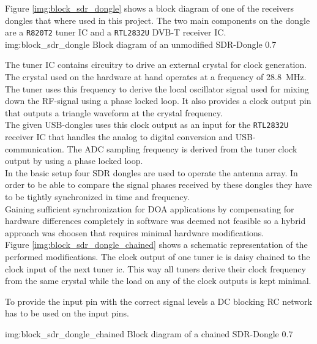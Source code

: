 Figure \ref{img:block_sdr_dongle} shows a block
diagram of one of the receivers dongles that where used
in this project.
The two main components on the dongle are a \texttt{R820T2} tuner IC
and a \texttt{RTL2832U} DVB-T receiver IC. \\

             {img:block_sdr_dongle}
             {Block diagram of an unmodified SDR-Dongle}
             {0.7}

The tuner IC contains circuitry to drive an
external crystal for clock generation.
The crystal used on the hardware at hand
operates at a frequency of \SI{28.8}{\mega\hertz}.
The tuner uses this frequency to derive the
local oscillator signal used for mixing down
the RF-signal using a phase locked loop.
It also provides a clock output pin that
outputs a triangle waveform at the crystal
frequency. \\

The given USB-dongles uses this clock output
as an input for the \texttt{RTL2832U}
receiver IC that handles the analog to digital
conversion and USB-communication.
The ADC sampling frequency is derived from
the tuner clock output by using a phase locked loop. \\

In the basic setup four SDR dongles are used
to operate the antenna array.
In order to be able to compare the signal phases
received by these dongles they have to be tightly
synchronized in time and frequency. \\

Gaining sufficient synchronization for DOA applications
by compensating for hardware differences completely
in software was deemed not feasible so a hybrid
approach was choosen that requires minimal hardware
modifications. \\


Figure \ref{img:block_sdr_dongle_chained} shows
a schematic representation of the performed modifications.
The clock output of one tuner ic is daisy chained to
the clock input of the next tuner ic.
This way all tuners derive their clock frequency
from the same crystal while the load on any of
the clock outputs is kept minimal.

To provide the input pin with the correct signal
levels a DC blocking RC network has to be used
on the input pins.

             {img:block_sdr_dongle_chained}
             {Block diagram of a chained SDR-Dongle}
             {0.7}

